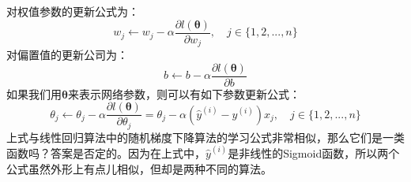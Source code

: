 \documentclass[UTF8]{article}
\begin{document}
对权值参数的更新公式为：
\begin{equation}
w_{j} \leftarrow w_{j} - \alpha \frac{\partial{l(\boldsymbol{\theta})}}{\partial{w_{j}}}, \quad j \in \{1, 2, ..., n\}
\label{lcrn-wj-update}
\end{equation}
对偏置值的更新公司为：
\begin{equation}
b \leftarrow b - \alpha \frac{\partial{l(\boldsymbol{\theta})}}{\partial{b}}
\label{lcrn-b-update}
\end{equation}
如果我们用$\boldsymbol{\theta}$来表示网络参数，则可以有如下参数更新公式：
\begin{equation}
\theta_{j} \leftarrow \theta_{j} - \alpha \frac{\partial{l(\boldsymbol{\theta})}}{\partial{\theta_{j}}}=\theta_{j} - \alpha (\hat{y}^{(i)} - y^{(i)})x_{j}, \quad j \in \{1, 2, ..., n\}
\label{lcrn-thetaj-update}
\end{equation}
上式与线性回归算法中的随机梯度下降算法的学习公式非常相似，那么它们是一类函数吗？答案是否定的。因为在上式中，$\hat{y}^{(i)}$是非线性的Sigmoid函数，所以两个公式虽然外形上有点儿相似，但却是两种不同的算法。
\end{document}
